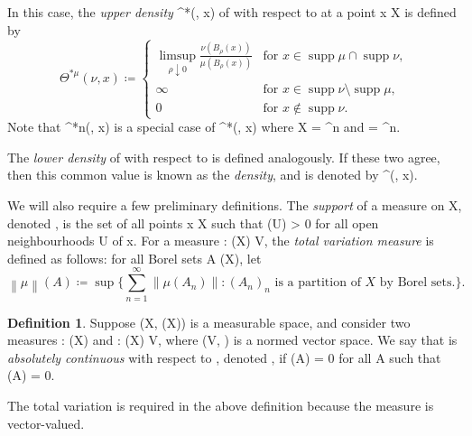 \documentclass[a4paper, 11pt]{article}
\theoremstyle{plain}
\theoremstyle{definition}
\newtheorem{definition}[theorem]{Definition}
\theoremstyle{remark}
\newcommand{\norm}[1]{\left\lVert#1\right\rVert}
\numberwithin{equation}{subsection}
\def\({}
\def\){}
\begin{document}
In this case, the \emph{upper density} \(\Theta^{*\mu}(\nu, x)\) of \(\nu\) with respect to \(\mu\) at a point \(x \in X\) is defined by
\begin{equation}
\Theta^{*\mu}(\nu, x) \coloneq
\begin{cases}
\limsup_{\rho \downarrow 0} \frac{\nu(B_{\rho}(x))}{\mu(B_{\rho}(x))} & \text{for } x \in \operatorname{supp} \mu \cap \operatorname{supp} \nu, \\
\infty & \text{for } x \in \operatorname{supp} \nu \setminus \operatorname{supp} \mu, \\
0 & \text{for } x \notin \operatorname{supp} \nu.
\end{cases}
\end{equation}
Note that \(\Theta^{*n}(\mu, x)\) is a special case of \(\Theta^{*\mu}(\nu, x)\) where \(X = ^{n}\) and \(\mu = ^{n}\).

The \emph{lower density} of \(\nu\) with respect to \(\mu\) is defined analogously. If these two agree, then this common value is known as the \emph{density}, and is denoted by \(\Theta^{\mu}(\nu, x)\).

We will also require a few preliminary definitions. The \emph{support} of a measure \(\mu\) on \(X\), denoted \( \mu\), is the set of all points \(x \in X\) such that \(\mu(U) > 0\) for all open neighbourhoods \(U\) of \(x\). For a measure \(\mu : (X) \rightarrow V\), the \emph{total variation measure} \(\norm{\mu}\) is defined as follows: for all Borel sets \(A \in {}(X)\), let
\begin{equation}
\norm{\mu}\!(A) \coloneq \sup\biggl\{\sum_{n=1}^{\infty} \norm{\mu(A_{n})} : (A_{n})_{n} \text{ is a partition of } X \text{ by Borel sets.}\biggr\}.
\end{equation}

\begin{definition}
Suppose  \((X, (X))\) is a measurable space, and consider two measures \(\mu : (X) \rightarrow [0, +\infty]\) and \(\nu : (X) \rightarrow V\), where \((V, \norm{\cdot})\) is a normed vector space. We say that \(\nu\) is \emph{absolutely continuous} with respect to \(\mu\), denoted \(\nu \ll \mu\), if \(\norm{\nu}\!(A) = 0\) for all \(A\) such that \(\mu(A) = 0\).
\end{definition}

The total variation is required in the above definition because the measure \(\nu\) is vector-valued.
\end{document}
